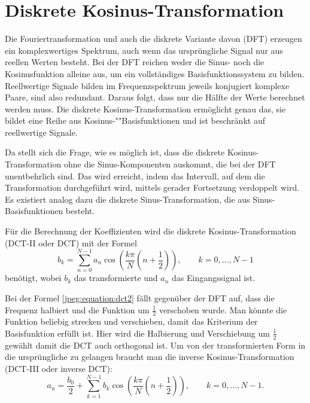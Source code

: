 %
%
%
%
\section{Diskrete Kosinus-Transformation
\label{jpeg:section:dct}}
Die Fouriertransformation und auch die diskrete Variante davon (DFT) erzeugen ein komplexwertiges Spektrum, auch wenn das ursprüngliche Signal nur aus reellen Werten besteht.
Bei der DFT reichen weder die Sinus- noch die Kosinusfunktion alleine aus, um ein vollständiges Basis\-funktions\-system zu bilden.
Reellwertige Signale bilden im Frequenzspektrum jeweils konjugiert komplexe Paare, sind also redundant.
Daraus folgt, dass nur die Hälfte der Werte berechnet werden muss.
Die diskrete Kosinus-Transformation ermöglicht genau das, sie bildet eine Reihe aus Kosinus-""Basisfunktionen und ist beschränkt auf reellwertige Signale.

Da stellt sich die Frage, wie es möglich ist, dass die diskrete Kosinus-Transformation ohne die Sinus-Komponenten auskommt, die bei der DFT unentbehrlich sind.
Das wird erreicht, indem das Intervall, auf dem die Transformation durchgeführt wird, mittels gerader Fortsetzung verdoppelt wird.
Es existiert analog dazu die diskrete Sinus-Transformation, die aus Sinus-Basisfunktionen besteht.

Für die Berechnung der Koeffizienten wird die diskrete Kosinus-Transformation (DCT-II oder DCT) mit der Formel
%
%
\begin{equation}
    b_k
    =
    \sum \limits_{n=0}^{N-1} a_n 
    \cos\left(
        \frac{k\pi}{N}\left(n + \frac{1}{2} \right) 
    \right),
    \qquad k = 0,\dots,N-1
\label{jpeg:equation:dct2}
\end{equation}
benötigt, wobei \(b_k\) das transformierte und \(a_n\) das Eingangssignal ist.

Bei der Formel \eqref{jpeg:equation:dct2} fällt gegenüber der DFT auf, dass die Frequenz halbiert und die Funktion um \(\frac{1}{2}\) verschoben wurde.
Man könnte die Funktion beliebig strecken und verschieben, damit das Kriterium der Basisfunktion erfüllt ist.
Hier wird die Halbierung und Verschiebung um \(\frac{1}{2}\) gewählt damit die DCT auch orthogonal ist.
Um von der transformierten Form in die ursprüngliche zu gelangen braucht man die inverse Kosinus-Transformation (DCT-III oder inverse DCT):
%
%
\begin{equation}
    a_n
    =
    \frac{b_0}{2} +
    \sum \limits_{k=1}^{N-1} b_k 
    \cos\left(
    \frac{k\pi}{N}\left(n + \frac{1}{2} \right) 
    \right),
    \qquad k = 0,\dots,N-1.
    \label{jpeg:equation:dct3}
\end{equation}

